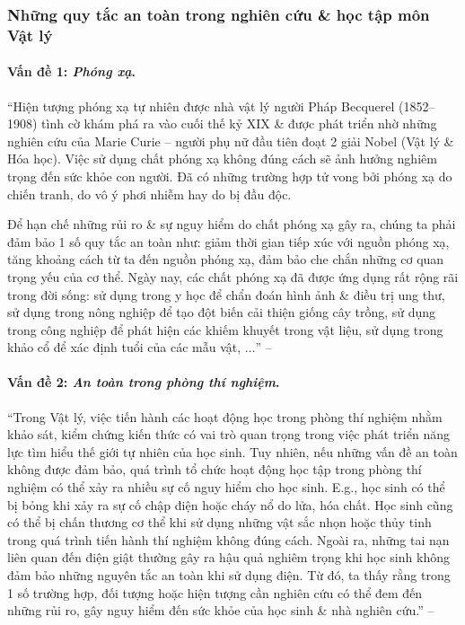 \documentclass[oneside]{book}
\numberwithin{equation}{section}
\begin{document}
\subsubsection{Những quy tắc an toàn trong nghiên cứu \& học tập môn Vật lý}

\paragraph{Vấn đề 1: \textit{Phóng xạ}.} ``Hiện tượng phóng xạ tự nhiên được nhà vật lý người Pháp Becquerel (1852--1908) tình cờ khám phá ra vào cuối thế kỷ XIX \& được phát triển nhờ những nghiên cứu của Marie Curie -- người phụ nữ đầu tiên đoạt 2 giải Nobel (Vật lý \& Hóa học). Việc sử dụng chất phóng xạ không đúng cách sẽ ảnh hưởng nghiêm trọng đến sức khỏe con người. Đã có những trường hợp tử vong bởi phóng xạ do chiến tranh, do vô ý phơi nhiễm hay do bị đầu độc.

Để hạn chế những rủi ro \& sự nguy hiểm do chất phóng xạ gây ra, chúng ta phải đảm bảo 1 số quy tắc an toàn như: giảm thời gian tiếp xúc với nguồn phóng xạ, tăng khoảng cách từ ta đến nguồn phóng xạ, đảm bảo che chắn những cơ quan trọng yếu của cơ thể. Ngày nay, các chất phóng xạ đã được ứng dụng rất rộng rãi trong đời sống: sử dụng trong y học để chẩn đoán hình ảnh \& điều trị ung thư, sử dụng trong nông nghiệp để tạo đột biến cải thiện giống cây trồng, sử dụng trong công nghiệp để phát hiện các khiếm khuyết trong vật liệu, sử dụng trong khảo cổ để xác định tuổi của các mẫu vật, $\ldots$'' -- \cite[pp. 12--13]{SGK_Vat_Ly_10_Chan_Troi_Sang_Tao}

\paragraph{Vấn đề 2: \textit{An toàn trong phòng thí nghiệm}.} ``Trong Vật lý, việc tiến hành các hoạt động học trong phòng thí nghiệm nhằm khảo sát, kiểm chứng kiến thức có vai trò quan trọng trong việc phát triển năng lực tìm hiểu thế giới tự nhiên của học sinh. Tuy nhiên, nếu những vấn đề an toàn không được đảm bảo, quá trình tổ chức hoạt động học tập trong phòng thí nghiệm có thể xảy ra nhiều sự cố nguy hiểm cho học sinh. E.g., học sinh có thể bị bỏng khi xảy ra sự cố chập điện hoặc cháy nổ do lửa, hóa chất. Học sinh cũng có thể bị chấn thương cơ thể khi sử dụng những vật sắc nhọn hoặc thủy tinh trong quá trình tiến hành thí nghiệm không đúng cách. Ngoài ra, những tai nạn liên quan đến điện giật thường gây ra hậu quả nghiêm trọng khi học sinh không đảm bảo những nguyên tắc an toàn khi sử dụng điện. Từ đó, ta thấy rằng trong 1 số trường hợp, đối tượng hoặc hiện tượng cần nghiên cứu có thể đem đến những rủi ro, gây nguy hiểm đến sức khỏe của học sinh \& nhà nghiên cứu.'' -- \cite[pp. 13--14]{SGK_Vat_Ly_10_Chan_Troi_Sang_Tao}
\end{document}
